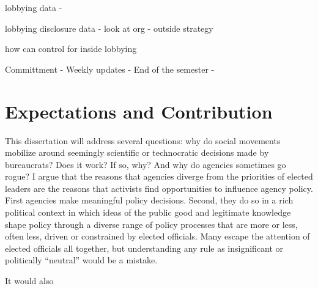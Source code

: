 lobbying data
- 

lobbying disclosure data 
- look at org 
- outside strategy 

how can control for inside lobbying 


Committment 
- Weekly updates 
- End of the semester
- 


% 

% 
% 
% 







\section{Expectations and Contribution}
This dissertation will address several questions: why do social movements mobilize around seemingly scientific or technocratic decisions made by bureaucrats? Does it work? If so, why? And why do agencies sometimes go rogue? I argue that the reasons that agencies diverge from the priorities of elected leaders are the reasons that activists find opportunities to influence agency policy. First agencies make meaningful policy decisions. Second, they do so in a rich political context in which ideas of the public good and legitimate knowledge shape policy through a diverse range of policy processes that are more or less, often less, driven or constrained by elected officials. Many escape the attention of elected officials all together, but understanding any rule as insignificant or politically “neutral” would be a mistake.

It would also 






